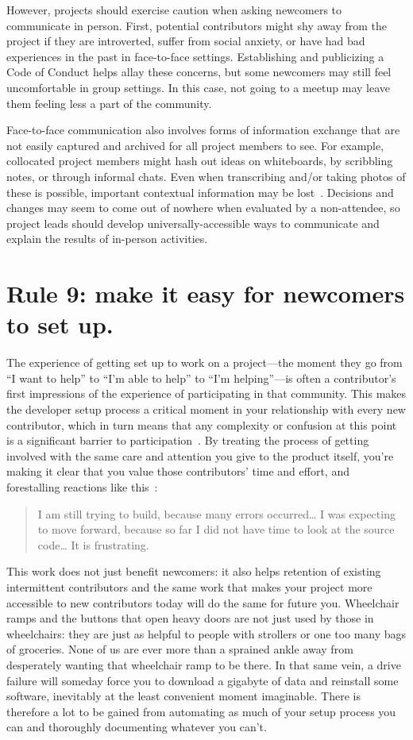 \documentclass[10pt,letterpaper]{article}
\newcommand{\rulemajor}[1]{\section*{#1}}
\begin{document}
However,
projects should exercise caution when asking newcomers to communicate in person.
First, potential contributors might shy away from the project if they are introverted,
suffer from social anxiety,
or have had bad experiences in the past in face-to-face settings.
Establishing and publicizing a Code of Conduct helps allay these concerns,
but some newcomers may still feel uncomfortable in group settings.
In this case,
not going to a meetup may leave them feeling less a part of the community.

Face-to-face communication also involves forms of information exchange
that are not easily captured and archived for all project members to see.
For example,
collocated project members might hash out ideas on whiteboards,
by scribbling notes,
or through informal chats.
Even when transcribing and/or taking photos of these is possible,
important contextual information may be lost~\cite{cherubini2007}.
Decisions and changes may seem to come out of nowhere when evaluated by a non-attendee,
so project leads should develop universally-accessible ways to communicate and explain the results of in-person activities.

\rulemajor{Rule 9: make it easy for newcomers to set up.}

The experience of getting set up to work on a project---the moment they go from ``I want to help''
to ``I'm able to help'' to ``I'm helping''---is often a contributor's first impressions of
the experience of participating in that community.
This makes the developer setup process a critical moment in your relationship with every new contributor,
which in turn means that any complexity or confusion at this point is a significant barrier to participation~\cite{steinmacher2014}.
By treating the process of getting involved with the same care and attention you give to the product itself,
you're making it clear that you value those contributors' time and effort,
and forestalling reactions like this~\cite{steinmacher2018b}:

\begin{quote}
  I am still trying to build, because many errors occurred{\ldots}
  I was expecting to move forward,
  because so far I did not have time to look at the source code{\ldots}
  It is frustrating.
\end{quote}

This work does not just benefit newcomers:
it also helps retention of existing intermittent contributors and the same work that makes your project more
accessible to new contributors today will do the same for future you.
Wheelchair ramps and the buttons that open heavy doors are not just used by those in wheelchairs:
they are just as helpful to people with strollers or one too many bags of groceries.
None of us are ever more than a sprained ankle away from desperately wanting that wheelchair ramp to be there.
In that same vein, a drive failure will someday force you to download a gigabyte of data
and reinstall some software, inevitably at the least convenient moment imaginable.
There is therefore a lot to be gained from automating as much of your setup process you can
and thoroughly documenting whatever you can't.
\end{document}
